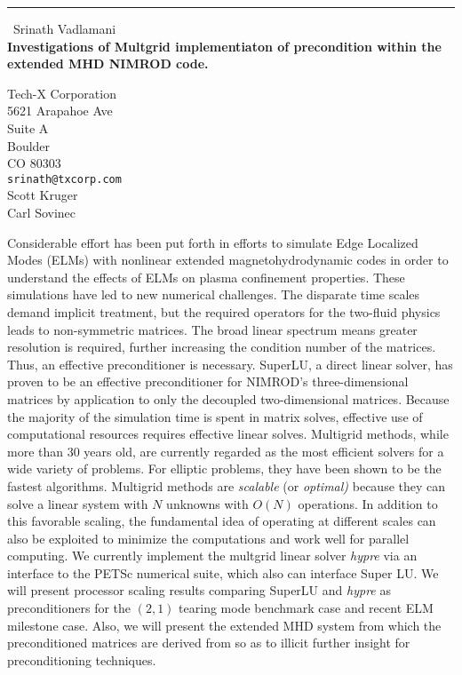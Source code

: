 \documentclass{report}
\begin{document}
\begin{center}
\rule{6in}{1pt} \
{\large Srinath Vadlamani \\
{\bf Investigations of Multgrid implementiaton of precondition within the extended MHD NIMROD code.}}

Tech-X Corporation \\ 5621 Arapahoe Ave \\ Suite A \\ Boulder \\ CO 80303
\\
{\tt srinath@txcorp.com}\\
Scott Kruger\\
Carl Sovinec\end{center}

Considerable effort has been put forth in efforts to simulate
Edge Localized Modes (ELMs) with nonlinear extended magnetohydrodynamic
codes in order to understand the effects of ELMs on plasma confinement
properties. These simulations have led to new numerical challenges.
The disparate time scales demand implicit treatment, but the required
operators for the two-fluid physics leads to non-symmetric matrices.
The broad linear spectrum means greater resolution is required, further
increasing the condition number of the matrices. Thus, an effective
preconditioner is necessary. SuperLU, a direct linear solver, has
proven to be an effective preconditioner for NIMROD's three-dimensional
matrices by application to only the decoupled two-dimensional matrices.
Because the majority of the simulation time is spent in matrix solves,
effective use of computational resources requires effective linear
solves. Multigrid methods, while more than 30 years old, are currently
regarded as the most efficient solvers for a wide variety of problems.
For elliptic problems, they have been shown to be the fastest algorithms.
Multigrid methods are \emph{scalable} (or \emph{optimal)} because
they can solve a linear system with $N$ unknowns with $O(N)$ operations.
In addition to this favorable scaling, the fundamental idea of operating
at different scales can also be exploited to minimize the computations
and work well for parallel computing. We currently implement the multgrid
linear solver \emph{hypre} via an interface to the PETSc numerical
suite, which also can interface Super LU. We will present processor
scaling results comparing SuperLU and \emph{hypre} as preconditioners
for the $(2,1)$ tearing mode benchmark case and recent ELM milestone
case. Also, we will present the extended MHD system from which the
preconditioned matrices are derived from so as to illicit further
insight for preconditioning techniques.
\end{document}
